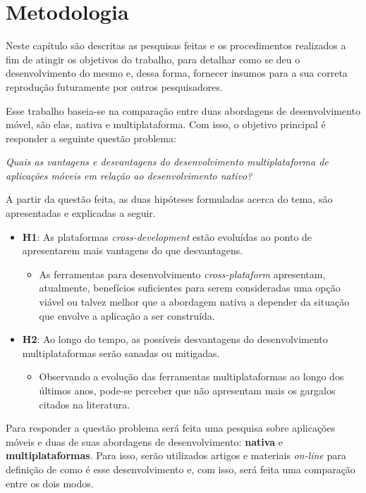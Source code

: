 \chapter{Metodologia} \label{cap:metodologia}
Neste capítulo são descritas as pesquisas feitas e os procedimentos realizados a 
fim de atingir os objetivos do trabalho, para detalhar como se deu o desenvolvimento do mesmo e, 
dessa forma, fornecer insumos para a sua correta reprodução futuramente por outros pesquisadores.

Esse trabalho baseia-se na comparação entre duas abordagens de desenvolvimento móvel, são elas, nativa e multiplataforma. 
Com isso, o objetivo principal é responder a seguinte questão problema:
\begin{center}
    \textit{Quais as vantagens e desvantagens do desenvolvimento multiplataforma de aplicações móveis em relação ao desenvolvimento nativo?}
\end{center}

A partir da questão feita, as duas hipóteses formuladas acerca do tema, são apresentadas e explicadas a seguir.

\begin{itemize}
    \item \textbf{H1}: As plataformas \textit{cross-development} estão evoluídas ao ponto de apresentarem mais vantagens do que desvantagens.
        \begin{itemize}
            \item As ferramentas para desenvolvimento \textit{cross-plataform} apresentam, atualmente, benefícios suficientes para serem consideradas uma opção viável ou talvez melhor que a abordagem nativa
            a depender da situação que envolve a aplicação a ser construída. 
        \end{itemize}
    \item \textbf{H2}: Ao longo do tempo, as possíveis desvantagens do desenvolvimento multiplataformas serão sanadas ou mitigadas.
        \begin{itemize}
            \item Observando a evolução das ferramentas multiplataformas ao longo dos últimos anos, pode-se perceber que não apresentam mais os gargalos citados na literatura.
        \end{itemize}
\end{itemize}

Para responder a questão problema será feita uma pesquisa sobre aplicações móveis e duas de suas abordagens de desenvolvimento: \textbf{nativa} e \textbf{multiplataformas}.
Para isso, serão utilizados artigos e materiais \textit{on-line} para definição de como é esse desenvolvimento e, com isso, será feita uma comparação entre os dois modos. 

